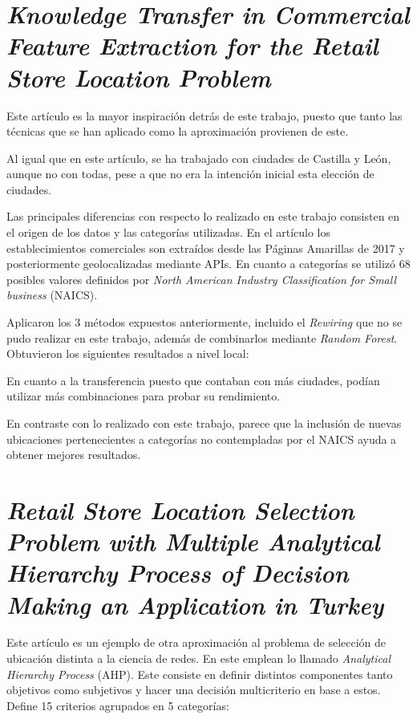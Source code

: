 
\section{\textit{Knowledge Transfer in Commercial Feature Extraction for the Retail Store Location Problem}}


Este artículo es la mayor inspiración detrás de este trabajo, puesto que tanto las técnicas que se han aplicado como la aproximación provienen de este. 

Al igual que en este artículo, se ha trabajado con ciudades de Castilla y León, aunque no con todas, pese a que no era la intención inicial esta elección de ciudades. 

Las principales diferencias con respecto lo realizado en este trabajo consisten en el origen de los datos y las categorías utilizadas. En el artículo los establecimientos comerciales son extraídos desde las Páginas Amarillas de 2017 y posteriormente geolocalizadas mediante APIs. En cuanto a categorías se utilizó 68 posibles valores definidos por \textit{North American Industry Classification for Small business} (NAICS).

Aplicaron los 3 métodos expuestos anteriormente, incluido el \textit{Rewiring} que no se pudo realizar en este trabajo, además de combinarlos mediante \textit{Random Forest}. Obtuvieron los siguientes resultados a nivel local:


En cuanto a la transferencia puesto que contaban con más ciudades, podían utilizar más combinaciones para probar su rendimiento.


En contraste con lo realizado con este trabajo, parece que la inclusión de nuevas ubicaciones pertenecientes a categorías no contempladas por el NAICS ayuda a obtener mejores resultados.

\section{\textit{Retail Store Location Selection Problem with Multiple Analytical Hierarchy Process of Decision Making an Application in Turkey}}

Este artículo es un ejemplo de otra aproximación al problema de selección de ubicación distinta a la ciencia de redes. En este emplean lo llamado \textit{Analytical Hierarchy Process} (AHP). Este consiste en definir distintos componentes tanto objetivos como subjetivos y hacer una decisión multicriterio en base a estos. Define 15 criterios agrupados en 5 categorías:


